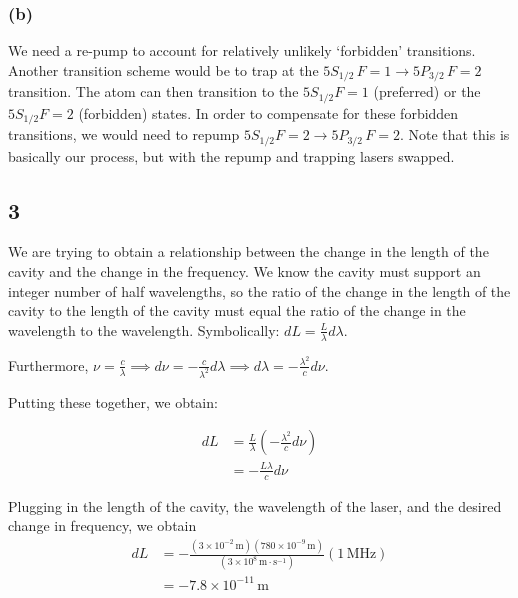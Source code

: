 \documentclass[12pt]{article}
\begin{document}
\subsubsection*{(b)}

We need a re-pump to account for relatively unlikely `forbidden' transitions.  Another transition scheme would be to trap at the $5S_{1/2}\, F=1\rightarrow 5P_{3/2}\, F=2 $ transition.  The atom can then transition to the $5S_{1/2} F=1$ (preferred) or the $5S_{1/2} F=2$ (forbidden) states.  In order to compensate for these forbidden transitions, we would need to repump $5S_{1/2} F=2 \rightarrow 5P_{3/2}\, F=2$.  Note that this is basically our process, but with the repump and trapping lasers swapped.

\subsection*{3}

We are trying to obtain a relationship between the change in the length of the cavity and the change in the frequency.  We know the cavity must support an integer number of half wavelengths, so the ratio of the change in the length of the cavity to the length of the cavity must equal the ratio of the change in the wavelength to the wavelength.  Symbolically: $dL = \frac{L}{\lambda}d\lambda$.

Furthermore, $\nu =\frac{c}{\lambda} \implies d\nu =-\frac{c}{\lambda^2}d\lambda \implies d\lambda = -\frac{\lambda^2}{c}d\nu$.

Putting these together, we obtain:

\begin{align*}
	dL &= \frac{L}{\lambda}\left(-\frac{\lambda^2}{c}d\nu\right)\\
	&=-\frac{L\lambda}{c}d\nu
\end{align*}

Plugging in the length of the cavity, the wavelength of the laser, and the desired change in frequency, we obtain
\begin{align*}
	dL &= -\frac{(3\times 10^{-2}\,\text{m})(780\times 10^{-9}\,\text{m})}{(3\times 10^8\, \text{m}\cdot \text{s}^{-1})}(1\,\text{MHz})\\
	&= -7.8 \times 10^{-11}\,\text{m}
\end{align*}



\end{document}
